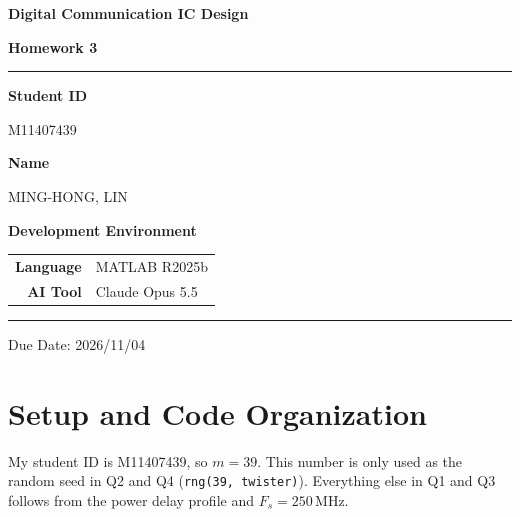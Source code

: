\documentclass[12pt,a4paper]{report}
\begin{document}
\pagestyle{plain}

\begin{titlepage}
\centering
\vspace*{3cm}

{\fontsize{28}{34}\selectfont\bfseries Digital Communication IC Design\par}
\vspace{0.6em}
{\fontsize{20}{26}\selectfont\bfseries Homework 3\par}

\vspace{1.5cm}
\textcolor{crimson}{\rule{0.6\linewidth}{1.2pt}}
\vspace{1.5cm}

{\large\bfseries Student ID}\par
\vspace{0.4em}
{\large M11407439}\par

\vspace{0.8em}

{\large\bfseries Name}\par
\vspace{0.4em}
{\large MING-HONG, LIN}\par

\vspace{2cm}

{\large\bfseries Development Environment}\par
\vspace{0.8em}
\begin{tabular}{rl}
    \textbf{Language} & MATLAB R2025b \\[4pt]
    \textbf{AI Tool}  & Claude Opus 5.5 \\
\end{tabular}

\vfill

\textcolor{crimson}{\rule{0.6\linewidth}{0.6pt}}\par
\vspace{0.5em}
{\small Due Date: 2026/11/04}

\end{titlepage}

\tableofcontents
\newpage


\chapter{Setup and Code Organization}
My student ID is M11407439, so $m = 39$. This number is only used as the random seed in Q2 and Q4
(\texttt{rng(39, \textquotesingle twister\textquotesingle)}). Everything else in Q1 and Q3 follows from the power delay profile and $F_s = 250$\,MHz.
\end{document}
